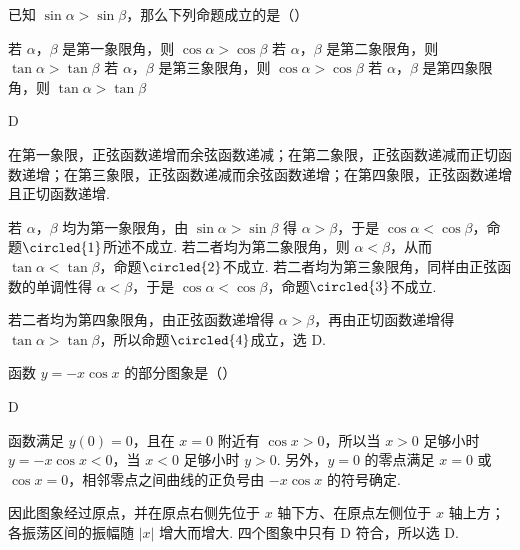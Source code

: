 \begin{problem}
已知 \(\sin \alpha > \sin \beta\)，那么下列命题成立的是（\quad）

\choices
    {若 \(\alpha\)，\(\beta\) 是第一象限角，则 \(\cos \alpha > \cos \beta\)}
    {若 \(\alpha\)，\(\beta\) 是第二象限角，则 \(\tan \alpha > \tan \beta\)}
    {若 \(\alpha\)，\(\beta\) 是第三象限角，则 \(\cos \alpha > \cos \beta\)}
    {若 \(\alpha\)，\(\beta\) 是第四象限角，则 \(\tan \alpha > \tan \beta\)}
\end{problem}

\begin{answer}
D
\end{answer}

\begin{solution}
在第一象限，正弦函数递增而余弦函数递减；在第二象限，正弦函数递减而正切函数递增；在第三象限，正弦函数递减而余弦函数递增；在第四象限，正弦函数递增且正切函数递增.

若 \(\alpha\)，\(\beta\) 均为第一象限角，由 \(\sin\alpha>\sin\beta\) 得 \(\alpha>\beta\)，于是 \(\cos\alpha<\cos\beta\)，命题\(\circled{1}\)所述不成立. 若二者均为第二象限角，则 \(\alpha<\beta\)，从而 \(\tan\alpha<\tan\beta\)，命题\(\circled{2}\)不成立. 若二者均为第三象限角，同样由正弦函数的单调性得 \(\alpha<\beta\)，于是 \(\cos\alpha<\cos\beta\)，命题\(\circled{3}\)不成立.

若二者均为第四象限角，由正弦函数递增得 \(\alpha>\beta\)，再由正切函数递增得 \(\tan\alpha>\tan\beta\)，所以命题\(\circled{4}\)成立，选 D.
\end{solution}

\begin{problem}
函数 \(y = -x\cos x\) 的部分图象是（\quad）

    {}
    {}
    {}
\end{problem}

\begin{answer}
D
\end{answer}

\begin{solution}
函数满足 \(y(0)=0\)，且在 \(x=0\) 附近有 \(\cos x>0\)，所以当 \(x>0\) 足够小时 \(y=-x\cos x<0\)，当 \(x<0\) 足够小时 \(y>0\). 另外，\(y=0\) 的零点满足 \(x=0\) 或 \(\cos x=0\)，相邻零点之间曲线的正负号由 \(-x\cos x\) 的符号确定.

因此图象经过原点，并在原点右侧先位于 \(x\) 轴下方、在原点左侧位于 \(x\) 轴上方；各振荡区间的振幅随 \(|x|\) 增大而增大. 四个图象中只有 D 符合，所以选 D.
\end{solution}

